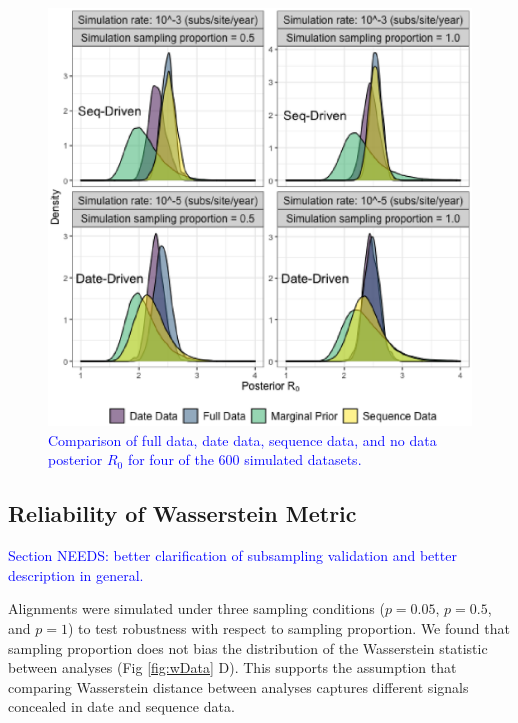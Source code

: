 \documentclass{article}
\begin{document}
\begin{figure}[H]
\centering
\includegraphics[width=1\linewidth]{../figures/postEg.eps}
\caption{\textcolor{blue}{Comparison of full data, date data, sequence data, and no data posterior $R_0$ for four of the 600 simulated datasets. }}
\label{fig:posts}
\end{figure}
\subsection*{Reliability of Wasserstein Metric}

\textcolor{blue}{Section NEEDS: better clarification of subsampling validation and better description in general.}

Alignments were simulated under three sampling conditions ($p=0.05$, $p=0.5$, and $p=1$) to test robustness with respect to sampling proportion. We found that sampling proportion does not bias the distribution of the Wasserstein statistic between analyses (Fig \ref{fig:wData} D). This supports the assumption that comparing Wasserstein distance between analyses captures different signals concealed in date and sequence data. 
\end{document}

